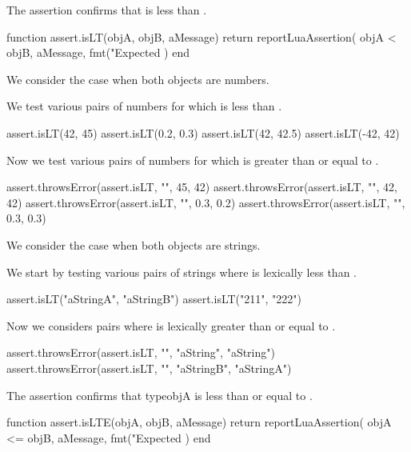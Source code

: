 \stopTestSuite


The  assertion confirms that  is less than 
. 

\startLuaCode
function assert.isLT(objA, objB, aMessage)
  return reportLuaAssertion(
    objA < objB,
    aMessage,
    fmt("Expected %
  )
end
\stopLuaCode


We consider the case when both objects are numbers.

We test various pairs of numbers for which  is less than 
. 

\startLuaTest
  assert.isLT(42, 45)
  assert.isLT(0.2, 0.3)
  assert.isLT(42, 42.5)
  assert.isLT(-42, 42)
\stopLuaTest

Now we test various pairs of numbers for which  is greater than 
or equal to . 

\startLuaTest
  assert.throwsError(assert.isLT, "", 45, 42)
  assert.throwsError(assert.isLT, "", 42, 42)
  assert.throwsError(assert.isLT, "", 0.3, 0.2)
  assert.throwsError(assert.isLT, "", 0.3, 0.3)
\stopLuaTest
\stopTestCase


We consider the case when both objects are strings. 

We start by testing various pairs of strings where  is 
lexically less than . 

\startLuaTest
  assert.isLT("aStringA", "aStringB")
  assert.isLT("211", "222")
\stopLuaTest

Now we considers pairs where  is lexically greater than or 
equal to . 

\startLuaTest
  assert.throwsError(assert.isLT, "", "aString", "aString")
  assert.throwsError(assert.isLT, "", "aStringB", "aStringA")
\stopLuaTest
\stopTestCase

\stopTestSuite


The  assertion confirms that type{objA} is less than or 
equal to . 

\startLuaCode
function assert.isLTE(objA, objB, aMessage)
  return reportLuaAssertion(
    objA <= objB,
    aMessage,
    fmt("Expected %
  )
end
\stopLuaCode


